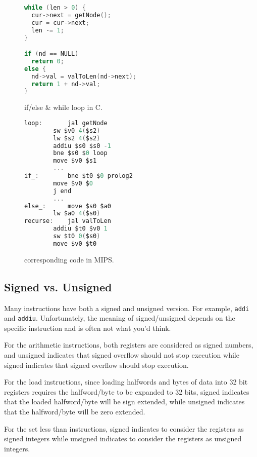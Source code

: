 \documentclass{article}
\begin{document}
\begin{figure}
\centering
\begin{minipage}{0.4\textwidth}
\renewcommand{\ttdefault}{pcr}
\begin{lstlisting}[language=C, basicstyle=\ttfamily]
while (len > 0) {
  cur->next = getNode();
  cur = cur->next;
  len -= 1;
}

if (nd == NULL)
  return 0;
else {
  nd->val = valToLen(nd->next);
  return 1 + nd->val;
}
\end{lstlisting}
\caption{if/else \& while loop in C.}
\vfill
\end{minipage}\hfill
%
\begin{minipage}{0.4\textwidth}
\raggedright
\renewcommand{\ttdefault}{pcr}
\begin{lstlisting}[language=C, basicstyle=\ttfamily, keywordstyle=\bfseries, showstringspaces=false, morekeywords={jal, addu, move, bne, j, sw, addiu, lw, jr}]
loop:		jal getNode
		sw $v0 4($s2)
		lw $s2 4($s2)
		addiu $s0 $s0 -1
		bne $s0 $0 loop
		move $v0 $s1
		...
if_:		bne $t0 $0 prolog2
		move $v0 $0
		j end
		...
else_:		move $s0 $a0
		lw $a0 4($s0)
recurse:	jal valToLen
		addiu $t0 $v0 1
		sw $t0 0($s0)
		move $v0 $t0		
\end{lstlisting}
\caption{corresponding code in MIPS.}
\end{minipage}
%

\end{figure}

\subsection{Signed vs. Unsigned}
Many instructions have both a signed and unsigned version. For example, \texttt{addi} and \texttt{addiu}. Unfortunately, the meaning of signed/unsigned depends on the specific instruction and is often not what you'd think. 

For the arithmetic instructions, both registers are considered as signed numbers, and unsigned indicates that signed overflow should not stop execution while signed indicates that signed overflow should stop execution. 

For the load instructions, since loading halfwords and bytes of data into 32 bit registers requires the halfword/byte to be expanded to 32 bits, signed indicates that the loaded halfword/byte will be sign extended, while unsigned indicates that the halfword/byte will be zero extended. 

For the set less than instructions, signed indicates to consider the registers as signed integers while unsigned indicates to consider the registers as unsigned integers.
\end{document}
